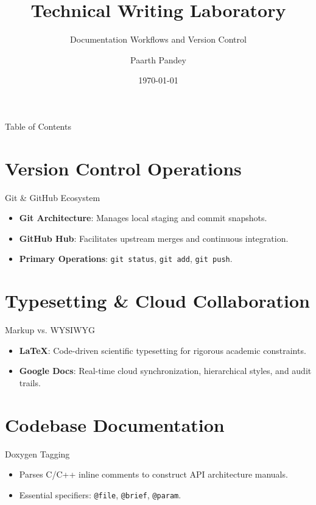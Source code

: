 ﻿\documentclass{beamer}
\title{Technical Writing Laboratory}
\subtitle{Documentation Workflows and Version Control}
\author{Paarth Pandey}
\institute{MNIT Jaipur}
\date{\today}
\begin{document}
\begin{frame}
  \titlepage
\end{frame}

\begin{frame}{Table of Contents}
  \tableofcontents
\end{frame}

\section{Version Control Operations}
\begin{frame}{Git \& GitHub Ecosystem}
  \begin{itemize}
    \item \textbf{Git Architecture}: Manages local staging and commit snapshots.
    \item \textbf{GitHub Hub}: Facilitates upstream merges and continuous integration.
    \item \textbf{Primary Operations}: \texttt{git status}, \texttt{git add}, \texttt{git push}.
  \end{itemize}
\end{frame}

\section{Typesetting \& Cloud Collaboration}
\begin{frame}{Markup vs. WYSIWYG}
  \begin{itemize}
    \item \textbf{\LaTeX}: Code-driven scientific typesetting for rigorous academic constraints.
    \item \textbf{Google Docs}: Real-time cloud synchronization, hierarchical styles, and audit trails.
  \end{itemize}
\end{frame}

\section{Codebase Documentation}
\begin{frame}{Doxygen Tagging}
  \begin{itemize}
    \item Parses C/C++ inline comments to construct API architecture manuals.
    \item Essential specifiers: \texttt{@file}, \texttt{@brief}, \texttt{@param}.
  \end{itemize}
\end{frame}
\end{document}
